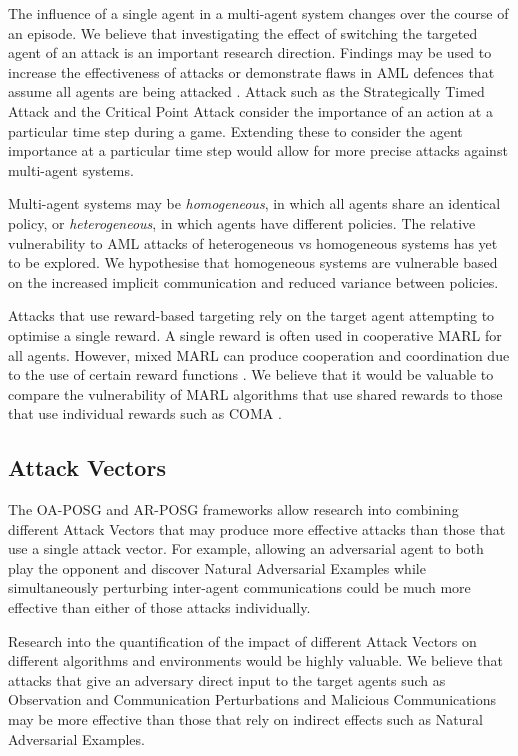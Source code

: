 \documentclass[conference,compsoc]{IEEEtran}
\begin{document}
The influence of a single agent in a multi-agent system changes over the course of an episode. We believe that investigating the effect of switching the targeted agent of an attack is an important research direction. Findings may be used to increase the effectiveness of attacks or demonstrate flaws in AML defences that assume all agents are being attacked \cite{mitchell_gaussian_2020, xue_mis-spoke_2022}. Attack such as the Strategically Timed Attack \cite{lin_tactics_2017} and the Critical Point Attack \cite{sun_stealthy_2020} consider the importance of an action at a particular time step during a game. Extending these to consider the agent importance  at a particular time step would allow for more precise attacks against multi-agent systems.

Multi-agent systems may be \textit{homogeneous}, in which all agents share an identical policy, or  \textit{heterogeneous}, in which agents have different policies. The relative vulnerability to AML attacks of heterogeneous vs homogeneous systems has yet to be explored. We hypothesise that homogeneous systems are vulnerable based on the increased implicit communication \cite{gupta_cooperative_2017} and reduced variance between policies. 

Attacks that use reward-based targeting rely on the target agent attempting to optimise a single reward. A single reward is often used in cooperative MARL for all agents. However, mixed MARL can produce cooperation and coordination due to the use of certain reward functions \cite{jaques_social_2019}. We believe that it would be valuable to compare the vulnerability of MARL algorithms that use shared rewards to those that use individual rewards such as COMA \cite{foerster_counterfactual_2018}. 

\subsection{Attack Vectors}

The OA-POSG and AR-POSG frameworks allow research into combining different Attack Vectors that may produce more effective attacks than those that use a single attack vector. For example, allowing an adversarial agent to both play the opponent and discover Natural Adversarial Examples while simultaneously perturbing inter-agent communications could be much more effective than either of those attacks individually.

Research into the quantification of the impact of different Attack Vectors on different algorithms and environments would be highly valuable. We believe that attacks that give an adversary direct input to the target agents such as Observation and Communication Perturbations and Malicious Communications may be more effective than those that rely on indirect effects such as Natural Adversarial Examples.
\end{document}
